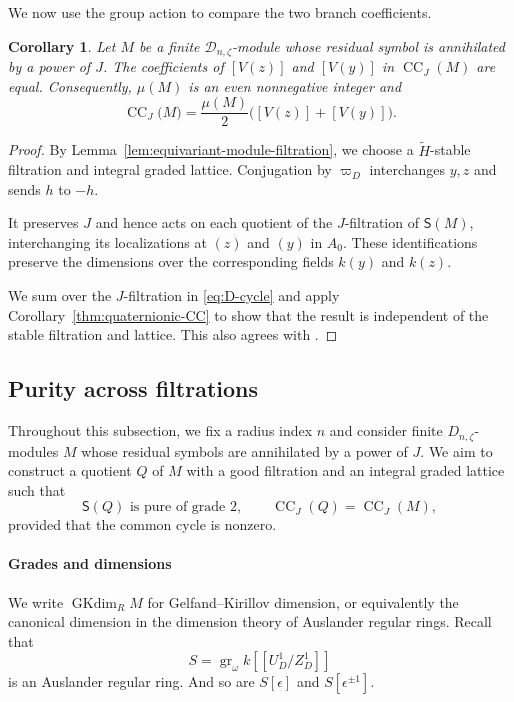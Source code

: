 \documentclass[11pt]{article}
\newtheorem{corollary}[theorem]{Corollary}
\theoremstyle{definition}
\newcommand{\gr}{\operatorname{gr}}
\newcommand{\CC}{\operatorname{CC}}
\begin{document}
We now use the group action to compare the two branch coefficients.

\begin{corollary}
\label{cor:D-symmetry}
Let $M$ be a finite $\mathscr D_{n,\zeta}$-module whose residual
symbol is annihilated by a power of $J$. The coefficients of
$[V(z)]$ and $[V(y)]$ in $\CC_J(M)$ are equal.
Consequently, $\mu(M)$ is an even
nonnegative integer and
\[
 \CC_J\bigl(M\bigr)=\frac{\mu(M)}{2}
                    \bigl([V(z)]+[V(y)]\bigr).
\]
\end{corollary}
\begin{proof}
By Lemma~\ref{lem:equivariant-module-filtration}, we choose a
$\widetilde H$-stable filtration and integral graded lattice. Conjugation
by $\varpi_D$ interchanges $y,z$ and sends $h$ to $-h$.

It preserves $J$ and hence acts on each quotient of the
$J$-filtration of $\mathsf S(M)$, interchanging its localizations
at $(z)$ and $(y)$ in $A_0$. These identifications preserve the
dimensions over the corresponding fields $k(y)$ and $k(z)$.

We sum over the $J$-filtration in \eqref{eq:D-cycle} and apply
Corollary~\ref{thm:quaternionic-CC} to show that the result is independent
of the stable filtration and lattice. This also agrees with \cite[Lemma~3.6]{HuWangPadic}.
\end{proof}

\subsection{Purity across filtrations}
\label{sec:nonexistence}
Throughout this subsection, we fix a radius index $n$ and consider
finite $D_{n,\zeta}$-modules $M$ whose residual symbols are
annihilated by a power of $J$.
We aim to construct a quotient $Q$ of $M$ with a good filtration and an
integral graded lattice such that
\[
 \mathsf S(Q)\text{ is pure of grade }2,\qquad
 \CC_J(Q)=\CC_J(M),
\]
provided that the common cycle is nonzero.

\paragraph{Grades and dimensions}
\label{sec:grade-comparison}

We write $\operatorname{GKdim}_R M$ for Gelfand--Kirillov dimension, or equivalently the canonical dimension 
in the dimension theory of Auslander regular rings. 
Recall that \[S=\gr_\omega k[\![U_D^1/Z_D^1]\!]\] is an Auslander regular ring. And so are $S[\epsilon]$ and $S[\epsilon^{\pm1}]$. 
\end{document}
